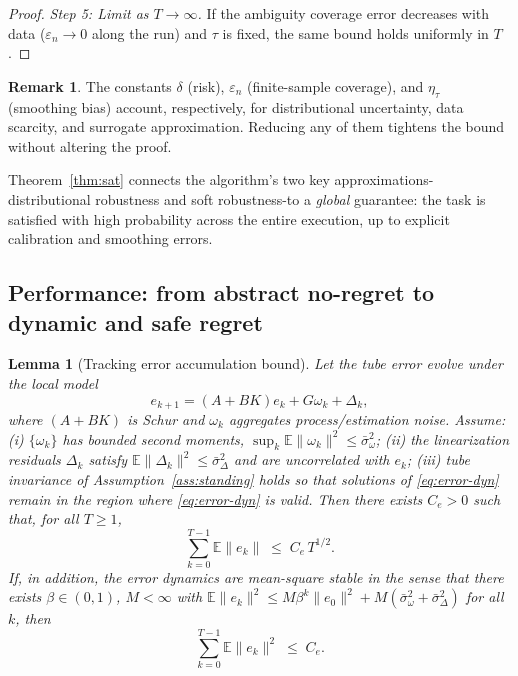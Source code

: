 \documentclass[journal]{IEEEtran}
\newtheorem{lemma}{Lemma}
\theoremstyle{definition}
\newtheorem{remark}{Remark}
\begin{document}
\begin{proof}
\textit{Step 5: Limit as $T\to\infty$.}
If the ambiguity coverage error decreases with data ($\varepsilon_n\to 0$ along the run) and
$\tau$ is fixed, the same bound holds uniformly in $T$.
\end{proof}

\begin{remark}
The constants $\delta$ (risk), $\varepsilon_n$ (finite-sample coverage), and $\eta_\tau$
(smoothing bias) account, respectively, for distributional uncertainty, data scarcity, and
surrogate approximation. Reducing any of them tightens the bound without altering the proof.
\end{remark}

 
 
Theorem~\ref{thm:sat} connects the algorithm's two key approximations-distributional robustness and soft robustness-to a \emph{global} guarantee: the task is satisfied with high probability across the entire execution, up to explicit calibration and smoothing errors.


\subsection{Performance: from abstract no-regret to dynamic and safe regret}

\begin{lemma}[Tracking error accumulation bound]
\label{lem:track}
Let the tube error evolve under the local model
\begin{equation}
e_{k+1}=(A{+}BK)e_k + G\omega_k + \Delta_k,
\label{eq:error-dyn}
\end{equation}
where $(A{+}BK)$ is Schur and $\omega_k$ aggregates process/estimation noise.
Assume: (i) $\{\omega_k\}$ has bounded second moments,
$\sup_k \mathbb{E}\|\omega_k\|^2 \le \bar\sigma_\omega^2$; (ii) the linearization residuals
$\Delta_k$ satisfy $\mathbb{E}\|\Delta_k\|^2 \le \bar\sigma_\Delta^2$ and are uncorrelated with $e_k$;
(iii) tube invariance of Assumption~\ref{ass:standing} holds so that solutions of
\eqref{eq:error-dyn} remain in the region where \eqref{eq:error-dyn} is valid.
Then there exists $C_e>0$ such that, for all $T\ge 1$,
\[
\sum_{k=0}^{T-1}\mathbb{E}\|e_k\| \;\le\; C_e\, T^{1/2}.
\]
If, in addition, the error dynamics are mean-square stable in the sense that there exists
$\beta\!\in\!(0,1)$, $M\!<\!\infty$ with
$\mathbb{E}\|e_k\|^2 \le M\beta^k \|e_0\|^2 + M(\bar\sigma_\omega^2+\bar\sigma_\Delta^2)$ for all $k$,
then
\[
\sum_{k=0}^{T-1}\mathbb{E}\|e_k\|^2 \;\le\; C_e.
\]
\end{lemma}
\end{document}
